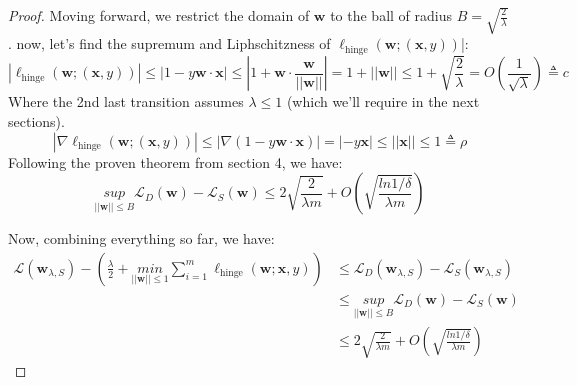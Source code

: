 \begin{proof}
    Moving forward, we restrict the domain of $\boldsymbol{w}$ to the ball of radius $B=\sqrt{\frac{2}{\lambda}}$. now, let's find the supremum and Liphschitzness of $\ell_{\text{hinge}}(\boldsymbol{w};(\boldsymbol{x}, y))$|:
    \begin{equation*}
        |\ell_{\text{hinge}}(\boldsymbol{w};(\boldsymbol{x}, y))| \leq |1-y\boldsymbol{w}\cdot\boldsymbol{x}| \leq |1 + \boldsymbol{w}\cdot \frac{\boldsymbol{w}}{||\boldsymbol{w}||}| = 1 + ||\boldsymbol{w}|| \leq 1+\sqrt{\frac{2}{\lambda}} = O(\frac{1}{\sqrt{\lambda}}) \triangleq c
    \end{equation*}
    Where the 2nd last transition assumes $\lambda \leq 1$ (which we'll require in the next sections).
    \begin{equation*}
        |\nabla \ell_{\text{hinge}}(\boldsymbol{w};(\boldsymbol{x}, y))| \leq |\nabla (1-y\boldsymbol{w}\cdot\boldsymbol{x})| = |-y\boldsymbol{x}| \leq ||\boldsymbol{x}|| \leq 1 \triangleq \rho
    \end{equation*}
    Following the proven theorem from section 4, we have:
    \begin{equation*}
        \underset{||\boldsymbol{w}|| \leq B}{sup} \mathcal{L}_D(\boldsymbol{w}) - \mathcal{L}_S(\boldsymbol{w}) \leq 2 \sqrt{\frac{2}{\lambda m}} + O\left(\sqrt{\frac{ln 1/\delta}{\lambda m}} \right)
    \end{equation*}

    Now, combining everything so far, we have:
    \begin{equation*}
        \begin{split}      
            \mathcal{L}(\boldsymbol{w}_{\lambda, S}) - \left(\frac{\lambda}{2} + \underset{||\boldsymbol{w}||\leq 1}{min} \sum_{i=1}^m \ell_{\text{hinge}}(\boldsymbol{w}; \boldsymbol{x}, y)\right)
            &\leq \mathcal{L}_D(\boldsymbol{w}_{\lambda, S}) - \mathcal{L}_S(\boldsymbol{w}_{\lambda, S}) \\
            &\leq \underset{||\boldsymbol{w}|| \leq B}{sup} \mathcal{L}_D(\boldsymbol{w}) - \mathcal{L}_S(\boldsymbol{w}) \\
            &\leq 2 \sqrt{\frac{2}{\lambda m}} + O\left(\sqrt{\frac{ln 1/\delta}{\lambda m}} \right)
        \end{split}
    \end{equation*}


\end{proof}
